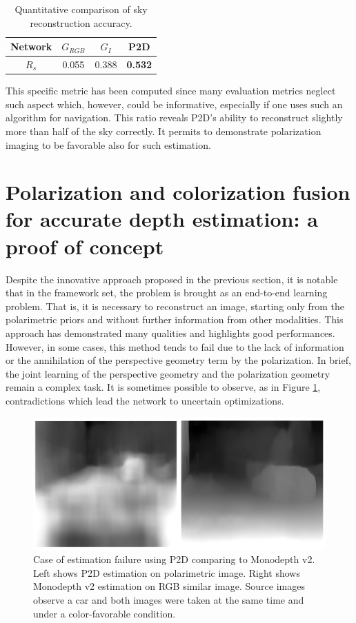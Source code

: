 \begin{center}
	\begin{table}[H]
		\centering
		\caption{Quantitative comparison of sky reconstruction accuracy.}
		\label{Reconsky}
		\begin{tabular}{c||ccc}
			\hline
			Network & $G_{RGB}$ & $G_{I}$ & P2D   \\ \hline \hline
			$R_s$      & 0.055     & 0.388   & \textbf{0.532} \\ \hline
		\end{tabular}
	\end{table}
\end{center}
This specific metric has been computed since many evaluation metrics neglect such aspect which, however, could be informative, especially if one uses such an algorithm for navigation. This ratio reveals P2D's ability to reconstruct slightly more than half of the sky correctly. It permits to demonstrate polarization imaging to be favorable also for such estimation.


\section{Polarization and colorization fusion for accurate depth estimation: a proof of concept}

Despite the innovative approach proposed in the previous section, it is notable that in the framework set, the problem is brought as an end-to-end learning problem.
That is, it is necessary to reconstruct an image, starting only from the polarimetric priors and without further information from other modalities.
This approach has demonstrated many qualities and highlights good performances. However, in some cases, this method tends to fail due to the lack of information or the annihilation of the perspective geometry term by the polarization.
In brief, the joint learning of the perspective geometry and the polarization geometry remain a complex task. It is sometimes possible to observe, as in Figure \ref{fig:polafail}, contradictions which lead the network to uncertain optimizations.

\begin{figure}[h]
	\centering
	\includegraphics[width=0.8\linewidth]{Figures/Fusion/polafail}
	\caption[Case of estimation failure using P2D comparing to Monodepth v2.]{Case of estimation failure using P2D comparing to Monodepth v2. Left shows P2D estimation on polarimetric image. Right shows Monodepth v2 estimation on RGB similar image. Source images observe a car and both images were taken at the same time and under a color-favorable condition.}
	\label{fig:polafail}
\end{figure}


